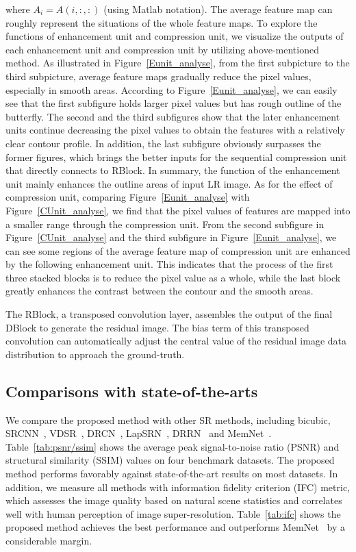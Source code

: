 \documentclass[10pt,twocolumn,letterpaper]{article}
\begin{document}
where ${A_i} = A\left( {i,:,:} \right)$ (using Matlab notation). The average feature map can roughly represent the situations of the whole feature maps. To explore the functions of enhancement unit and compression unit, we visualize the outputs of each enhancement unit and compression unit by utilizing above-mentioned method.  As illustrated in Figure~\ref{Eunit_analyse}, from the first subpicture to the third subpicture, average feature maps gradually reduce the pixel values, especially in smooth areas. According to Figure~\ref{Eunit_analyse}, we can easily see that the first subfigure holds larger pixel values but has rough outline of the butterfly. The second and the third subfigures show that the later enhancement units continue decreasing the pixel values to obtain the features with a relatively clear contour profile. In addition, the last subfigure obviously surpasses the former figures, which brings the better inputs for the sequential compression unit that directly connects to RBlock. In summary, the function of the enhancement unit mainly enhances the outline areas of input LR image. As for the effect of compression unit, comparing Figure~\ref{Eunit_analyse} with Figure~\ref{CUnit_analyse}, we find that the pixel values of features are mapped into a smaller range through the compression unit. From the second subfigure in Figure~\ref{CUnit_analyse} and the third subfigure in Figure~\ref{Eunit_analyse}, we can see some regions of the average feature map of compression unit are enhanced by the following enhancement unit. This indicates that the process of the first three stacked blocks is to reduce the pixel value as a whole, while the last block greatly enhances the contrast between the contour and the smooth areas.

The RBlock, a transposed convolution layer, assembles the output of the final DBlock to generate the residual image. The bias term of this transposed convolution can automatically adjust the central value of the residual image data distribution to approach the ground-truth.

\subsection{Comparisons with state-of-the-arts}
We compare the proposed method with other SR methods, including bicubic, SRCNN~\cite{SRCNN,SRCNN-Ex}, VDSR~\cite{VDSR}, DRCN~\cite{DRCN}, LapSRN~\cite{LapSRN}, DRRN~\cite{DRRN} and MemNet~\cite{MemNet}. Table~\ref{tab:psnr/ssim} shows the average peak signal-to-noise ratio (PSNR) and structural similarity (SSIM) values on four benchmark datasets. The proposed method performs favorably against state-of-the-art results on most datasets. In addition, we measure all methods with information fidelity criterion (IFC) metric, which assesses the image quality based on natural scene statistics and correlates well with human perception of image super-resolution. Table~\ref{tab:ifc} shows the proposed method achieves the best performance and outperforms MemNet~\cite{MemNet} by a considerable margin.
\end{document}
